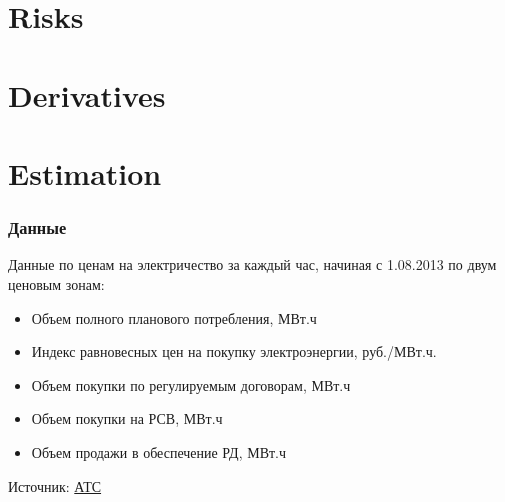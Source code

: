 \documentclass[c, dvipsnames]{beamer}  %
\begin{document}
\section{Risks}


\section{Derivatives}


\section{Estimation}


\begin{frame}[shrink=5]
\frametitle{Данные} 


Данные по ценам на электричество за каждый час, начиная с 1.08.2013 по двум ценовым зонам: 

\begin{itemize}
	\item Объем полного планового потребления, МВт.ч
	\item Индекс равновесных цен на покупку электроэнергии, руб./МВт.ч.
	\item Объем покупки по регулируемым договорам, МВт.ч
	\item  Объем покупки на РСВ, МВт.ч	
	\item Объем продажи в обеспечение РД, МВт.ч	
%	
	
\end{itemize}

Источник: \href{https://www.atsenergo.ru/results/rsv}{АТС}




%
%
%
%
%


\end{frame}
\end{document}
